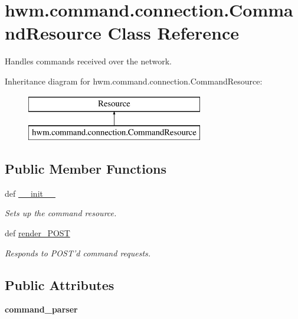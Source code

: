 \hypertarget{classhwm_1_1command_1_1connection_1_1_command_resource}{\section{hwm.\-command.\-connection.\-Command\-Resource Class Reference}
\label{classhwm_1_1command_1_1connection_1_1_command_resource}
}


Handles commands received over the network.  


Inheritance diagram for hwm.\-command.\-connection.\-Command\-Resource\-:\begin{figure}[H]
\begin{center}
\leavevmode
\includegraphics[height=2.000000cm]{classhwm_1_1command_1_1connection_1_1_command_resource}
\end{center}
\end{figure}
\subsection*{Public Member Functions}
\begin{DoxyCompactItemize}
\item 
def \hyperlink{classhwm_1_1command_1_1connection_1_1_command_resource_aaecfa10fd51602a8f94bc5da86af430c}{\-\_\-\-\_\-init\-\_\-\-\_\-}
\begin{DoxyCompactList}\small\item\em Sets up the command resource. \end{DoxyCompactList}\item 
def \hyperlink{classhwm_1_1command_1_1connection_1_1_command_resource_af13a69d52bed3ec7b217e315a461a6ef}{render\-\_\-\-P\-O\-S\-T}
\begin{DoxyCompactList}\small\item\em Responds to P\-O\-S\-T'd command requests. \end{DoxyCompactList}\end{DoxyCompactItemize}
\subsection*{Public Attributes}
\begin{DoxyCompactItemize}
\item 
\hypertarget{classhwm_1_1command_1_1connection_1_1_command_resource_ad20ce816997b1725ac26a5a97867fb40}{{\bfseries command\-\_\-parser}}\label{classhwm_1_1command_1_1connection_1_1_command_resource_ad20ce816997b1725ac26a5a97867fb40}

\end{DoxyCompactItemize}
